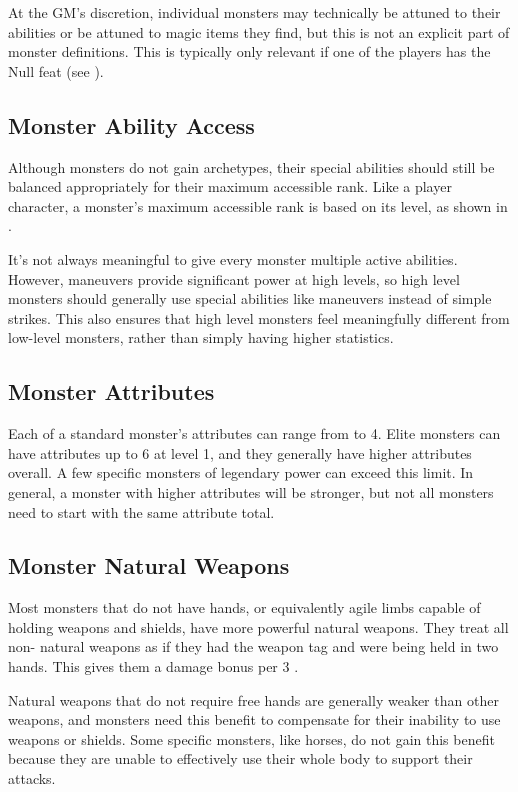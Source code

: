     At the GM's discretion, individual monsters may technically be attuned to their abilities or be attuned to magic items they find, but this is not an explicit part of monster definitions.
    This is typically only relevant if one of the players has the Null feat (see ).

  \subsection{Monster Ability Access}\label{Monster Ability Access}
    Although monsters do not gain archetypes, their special abilities should still be balanced appropriately for their maximum accessible rank.
    Like a player character, a monster's maximum accessible rank is based on its level, as shown in .

    It's not always meaningful to give every monster multiple active abilities.
    However, maneuvers provide significant power at high levels, so high level monsters should generally use special abilities like maneuvers instead of simple strikes.
    This also ensures that high level monsters feel meaningfully different from low-level monsters, rather than simply having higher statistics.

  \subsection{Monster Attributes}\label{Monster Attributes}
    Each of a standard monster's attributes can range from  to 4.
    Elite monsters can have attributes up to 6 at level 1, and they generally have higher attributes overall.
    A few specific monsters of legendary power can exceed this limit.
    In general, a monster with higher attributes will be stronger, but not all monsters need to start with the same attribute total.

  \subsection{Monster Natural Weapons}\label{Monster Natural Weapon}
    Most monsters that do not have hands, or equivalently agile limbs capable of holding weapons and shields, have more powerful natural weapons.
    They treat all non- natural weapons as if they had the  weapon tag and were being held in two hands.
    This gives them a  damage bonus per 3 .

    Natural weapons that do not require free hands are generally weaker than other weapons, and monsters need this benefit to compensate for their inability to use weapons or shields.
    Some specific monsters, like horses, do not gain this benefit because they are unable to effectively use their whole body to support their attacks.


